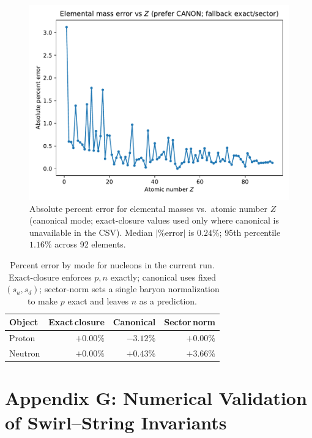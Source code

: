 \documentclass[smallextended]{svjour3}       %
\begin{document}
		\begin{figure}[t]
		\centering
		\includegraphics[width=0.75\linewidth]{images/elements_error_by_Z_canonical}
		\caption{Absolute percent error for elemental masses vs.\ atomic number \(Z\) (canonical mode; exact-closure values used only where canonical is unavailable in the CSV). Median \(|\%\text{error}|\) is \(0.24\%\); 95th percentile \(1.16\%\) across 92 elements.}
		\label{fig:elements_error_by_Z}
		\end{figure}

		\begin{table}[t]
		\centering
		\begin{tabular}{lrrr}
		\toprule
		\textbf{Object} & \textbf{Exact\,closure} & \textbf{Canonical} & \textbf{Sector\,norm} \\
		\midrule
		Proton  & \(+0.00\%\) & \(-3.12\%\) & \(+0.00\%\) \\
		Neutron & \(+0.00\%\) & \(+0.43\%\) & \(+3.66\%\) \\
		\bottomrule
		\end{tabular}
		\caption{Percent error by mode for nucleons in the current run. Exact-closure enforces \(p,n\) exactly; canonical uses fixed \((s_u,s_d)\); sector-norm sets a single baryon normalization to make \(p\) exact and leaves \(n\) as a prediction.}
		\label{tab:pn_modes}
		\end{table}

\section*{Appendix G: Numerical Validation of Swirl–String Invariants}
\label{sec:numerical-validation}
\end{document}
